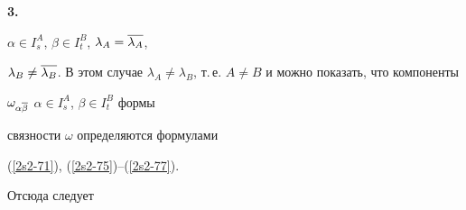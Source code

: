 {\bf 3.}


$\alpha \in I^A_s$, $\beta\in I^B_t$, $\lambda_A = \overline{\lambda_A}$,


$\lambda_B \neq \ol{\lambda_B}$. В этом случае $\lambda_A \neq


\lambda_B$, т.\,е. $A \neq B$ и можно показать, что компоненты


$\omega_{\alpha\overline\beta}$ $\alpha\in I^A_s$, $\beta\in I^B_t$ формы


связности $\omega$ определяются формулами


(\ref{2s2-71}), (\ref{2s2-75})--(\ref{2s2-77}).





Отсюда следует





